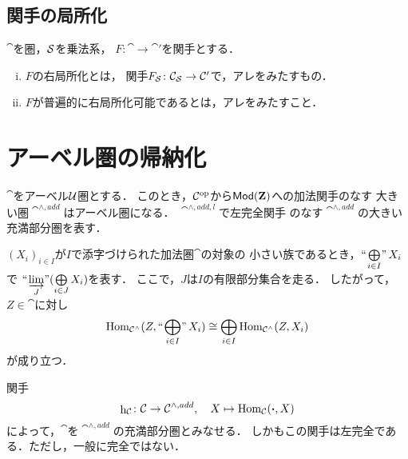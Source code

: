 \subsection{関手の局所化}
\(\cat\)を圏，\(\mathcal{S}\)を乗法系，
\(F\colon\cat\to\cat'\)を関手とする．
\begin{Definition}
    \begin{enumerate}[(i)]
        \item \(F\)の右局所化とは，
        関手\(F_\mathcal{S}\colon\mathcal{C}_\mathcal{S}\to\mathcal{C}'\)で，アレをみたすもの．
        \item \(F\)が普遍的に右局所化可能であるとは，アレをみたすこと．
    \end{enumerate}
\end{Definition}


\section[アーベル圏の帰納化]{アーベル圏の帰納化}

$\cat$をアーベル$\mathcal{U}$圏とする．
このとき，$\mathcal{C}^{\rm op}$から$\mathop{\textsf{Mod}}\nolimits(\mathbf{Z})$への加法関手のなす
大きい圏$\cat^{\wedge,add}$はアーベル圏になる．
$\cat^{\wedge,add,l}$で左完全関手
のなす$\cat^{\wedge,add}$の大きい充満部分圏を表す．

\begin{Notation}
    $(X_i)_{i\in I}$が$I$で添字づけられた加法圏$\cat$の対象の
    小さい族であるとき，$\ind<\bigoplus_{i\in I}>X_i$で
    $\ind<\varinjlim_J>(\bigoplus\limits_{i\in J}X_i)$を表す．
    ここで，$J$は$I$の有限部分集合を走る．
    したがって，$Z\in\cat$に対し
    \begin{equation*}
        \Hom_{\cat^\wedge}(Z,\ind<\bigoplus_{i\in I}>X_i)
        \cong
        \bigoplus_{i\in I}\Hom_{\cat^\wedge}(Z,X_i)
    \end{equation*}
    が成り立つ．
\end{Notation}

関手
\begin{equation*}
    \mathop{\mathrm{h}}\nolimits_{\mathcal{C}}\colon\mathcal{C}\to\mathcal{C}^{\wedge,add},\quad X\mapsto\mathop{\mathrm{Hom}}\nolimits_{\mathcal{C}}(\boldsymbol{\cdot},X)
\end{equation*}
によって，$\cat$を$\cat^{\wedge,add}$の充満部分圏とみなせる．
しかもこの関手は左完全である．ただし，一般に完全ではない．

